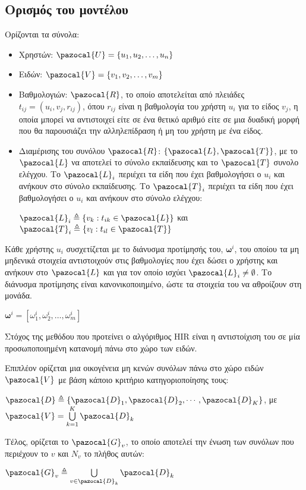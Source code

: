 \subsection{Ορισμός του μοντέλου}
Ορίζονται τα σύνολα:
\begin{itemize}
 \item Χρηστών: $\pazocal{U} = \{u_1, u_2, \dots, u_n\}$
 \item Ειδών: $\pazocal{V} = \{ v_1, v_2, \dots, v_m \}$
 \item Βαθμολογιών: $\pazocal{R}$, το οποίο αποτελείται από πλειάδες $t_{ij} = (u_i, v_j, r_{ij})$, όπου $r_{ij}$ είναι η βαθμολογία του χρήστη $u_i$ για το είδος $v_j$, η οποία μπορεί να αντιστοιχεί είτε σε ένα θετικό αριθμό είτε σε μια δυαδική μορφή που θα παρουσιάζει την αλληλεπίδραση ή μη του χρήστη με ένα είδος.
 \item Διαμέρισης του συνόλου $\pazocal{R}$: $\{\pazocal{L}, \pazocal{T}\}$, με το $\pazocal{L}$ να αποτελεί το σύνολο εκπαίδευσης και το $\pazocal{T}$ συνολο ελέγχου. Το $\pazocal{L}_i$ περιέχει τα είδη που έχει βαθμολογήσει ο $u_i$ και ανήκουν στο σύνολο εκπαίδευσης. Το $\pazocal{T}_i$ περιέχει τα είδη που έχει βαθμολογήσει ο $u_i$ και ανήκουν στο σύνολο ελέγχου:
 \begin{center} $\pazocal{L}_i \triangleq \{v_k : t_{ik} \in \pazocal{L} \}$ και $\pazocal{T}_i \triangleq \{v_l : t_{il} \in \pazocal{T} \}$
 \end{center}
\end{itemize}\par
Κάθε χρήστης $u_i$ συσχετίζεται με το διάνυσμα προτίμησής του, $\boldsymbol{\omega}^{i}$, του οποίου τα μη μηδενικά στοιχεία αντιστοιχούν στις βαθμολογίες που έχει δώσει ο χρήστης και ανήκουν στο $\pazocal{L}$ και για τον οποίο ισχύει $\pazocal{L}_i \neq \emptyset$. Το διάνυσμα προτίμησης είναι κανονικοποιημένο, ώστε τα στοιχεία του να αθροίζουν στη μονάδα. 
\begin{center}
$\boldsymbol{\omega}^i = [\omega_1^i, \omega_2^i, \dots, \omega_m^i ]$
\end{center}\par
Στόχος της μεθόδου που προτείνει ο αλγόριθμος {\en HIR} είναι η αντιστοίχιση του σε μία προσωποποιημένη κατανομή πάνω στο χώρο των ειδών.\par
Επιπλέον ορίζεται μια οικογένεια μη κενών συνόλων πάνω στο χώρο ειδών $\pazocal{V}$ με βάση κάποιο κριτήριο κατηγοριοποίησης τους:
\begin{center}
$\pazocal{D} \triangleq \{\pazocal{D}_1, \pazocal{D}_2, \cdots, \pazocal{D}_K\}$, με $\pazocal{V} = \bigcup\limits_{k=1}^{K} \pazocal{D}_k$
\end{center}
Τέλος, ορίζεται το $\pazocal{G}_v$, το οποίο αποτελεί την ένωση των συνόλων που περιέχουν το $v$ και $N_v$ το πλήθος αυτών:
\begin{center}
$\pazocal{G}_v \triangleq \bigcup\limits_{v \in \pazocal{D}_k} \pazocal{D}_k$
\end{center}

